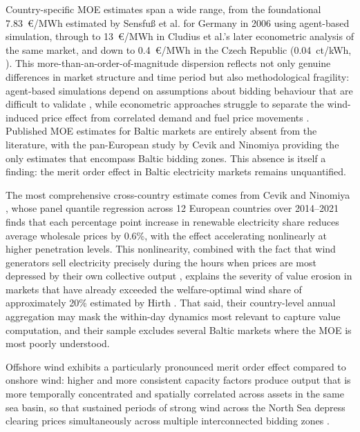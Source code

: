 Country-specific MOE estimates span a wide range, from the foundational 7.83~\euro/MWh estimated by Sensfu\ss{} et al. \cite{Sensfuss2008} for Germany in 2006 using agent-based simulation, through to 13~\euro/MWh in Cludius et al.'s \cite{Cludius2014} later econometric analysis of the same market, and down to 0.4~\euro/MWh in the Czech Republic (0.04~ct/kWh, \cite{Lunackova2017}). This more-than-an-order-of-magnitude dispersion reflects not only genuine differences in market structure and time period but also methodological fragility: agent-based simulations depend on assumptions about bidding behaviour that are difficult to validate \cite{Sensfuss2008}, while econometric approaches struggle to separate the wind-induced price effect from correlated demand and fuel price movements \cite{Wurzburg2013, Clo2015, Kolb2020}. Published MOE estimates for Baltic markets are entirely absent from the literature, with the pan-European study by Cevik and Ninomiya \cite{Cevik2022} providing the only estimates that encompass Baltic bidding zones. This absence is itself a finding: the merit order effect in Baltic electricity markets remains unquantified.

\vspace{4pt}

The most comprehensive cross-country estimate comes from Cevik and Ninomiya \cite{Cevik2022}, whose panel quantile regression across 12 European countries over 2014--2021 finds that each percentage point increase in renewable electricity share reduces average wholesale prices by 0.6\%, with the effect accelerating nonlinearly at higher penetration levels. This nonlinearity, combined with the fact that wind generators sell electricity precisely during the hours when prices are most depressed by their own collective output \cite{Hirth2013}, explains the severity of value erosion in markets that have already exceeded the welfare-optimal wind share of approximately 20\% estimated by Hirth \cite{HirthOptimal2015}. That said, their country-level annual aggregation may mask the within-day dynamics most relevant to capture value computation, and their sample excludes several Baltic markets where the MOE is most poorly understood.

\vspace{4pt}

Offshore wind exhibits a particularly pronounced merit order effect compared to onshore wind: higher and more consistent capacity factors produce output that is more temporally concentrated and spatially correlated across assets in the same sea basin, so that sustained periods of strong wind across the North Sea depress clearing prices simultaneously across multiple interconnected bidding zones \cite{Yamujala2026}.

